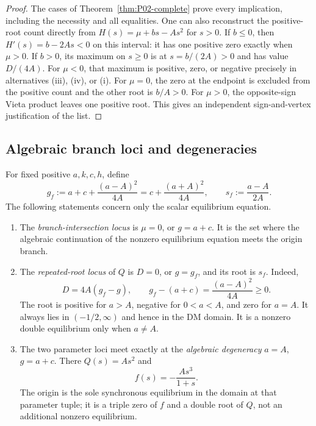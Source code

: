 \begin{proof}
The cases of Theorem~\ref{thm:P02-complete} prove every implication,
including the necessity and all equalities. One can also reconstruct
the positive-root count directly from
$H(s)=\mu+bs-As^2$ for $s>0$. If $b\le0$, then
$H'(s)=b-2As<0$ on this interval: it has one positive zero exactly
when $\mu>0$. If $b>0$, its maximum on $s\ge0$ is at
$s=b/(2A)>0$ and has value $D/(4A)$. For $\mu<0$, that maximum
is positive, zero, or negative precisely in alternatives (iii),
(iv), or (i). For $\mu=0$, the zero at the endpoint is excluded
from the positive count and the other root is $b/A>0$. For
$\mu>0$, the opposite-sign Vieta product leaves one positive root.
This gives an independent sign-and-vertex justification of the list.
\end{proof}

\subsection{Algebraic branch loci and degeneracies}

\begin{proposition}
\label{prop:P02-loci}
For fixed positive $a,k,c,h$, define
\begin{equation}
\label{eq:P02-gf}
 g_f:=a+c+\frac{(a-A)^2}{4A}
      =c+\frac{(a+A)^2}{4A},\qquad
 s_f:=\frac{a-A}{2A}.
\end{equation}
The following statements concern only the scalar equilibrium equation.
\begin{enumerate}[label=(\roman*),leftmargin=*]
\item The \emph{branch-intersection locus} is $\mu=0$, or $g=a+c$.
It is the set where the algebraic continuation of the nonzero
equilibrium equation meets the origin branch.
\item The \emph{repeated-root locus} of $Q$ is $D=0$, or $g=g_f$,
and its root is $s_f$. Indeed,
\begin{equation}
\label{eq:P02-discriminant-factor}
 D=4A(g_f-g),\qquad
 g_f-(a+c)=\frac{(a-A)^2}{4A}\ge0.
\end{equation}
The root is positive for $a>A$, negative for $0<a<A$, and zero
for $a=A$. It always lies in $(-1/2,\infty)$ and hence in the
DM domain. It is a nonzero double equilibrium only when $a\ne A$.
\item The two parameter loci meet exactly at the \emph{algebraic
degeneracy} $a=A$, $g=a+c$. There $Q(s)=As^2$ and
\begin{equation}
\label{eq:P02-degenerate-field}
 f(s)=-\frac{As^3}{1+s}.
\end{equation}
The origin is the sole synchronous equilibrium in the domain at
that parameter tuple; it is a triple zero of $f$ and a double root
of $Q$, not an additional nonzero equilibrium.
\end{enumerate}
\end{proposition}

